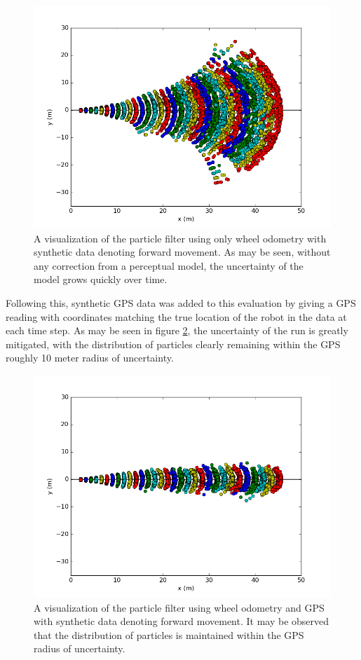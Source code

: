 \documentclass[letterpaper, 12 pt, conference]{ieeeconf}  %
\begin{document}
\begin{figure}[h]
\centering
\includegraphics[scale=0.60]{NO_GPS}
\caption{A visualization of the particle filter using only wheel odometry with synthetic data denoting forward movement. As may be seen, without any correction from a perceptual model, the uncertainty of the model grows quickly over time. }
\label{odometry_error}
\end{figure}

Following this, synthetic GPS data was added to this evaluation by giving a GPS reading with coordinates matching the true location of the robot in the data at each time step. As may be seen in figure \ref{with_gps}, the uncertainty of the run is greatly mitigated, with the distribution of particles clearly remaining within the GPS roughly 10 meter radius of uncertainty. 

\begin{figure}[h]
\centering
\includegraphics[scale=0.60]{With_GPS}
\caption{A visualization of the particle filter using wheel odometry and GPS with synthetic data denoting forward movement. It may be observed that the distribution of particles is maintained within the GPS radius of uncertainty. }
\label{with_gps}
\end{figure}
\end{document}
